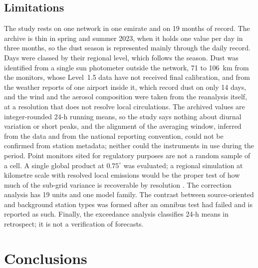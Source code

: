 \subsection{Limitations}
\label{sec:limits}

The study rests on one network in one emirate and on 19 months of record. The archive is thin in
spring and summer 2023, when it holds one value per day in three months, so the dust season is
represented mainly through the daily record. Days were classed by their regional \pmten{} level,
which follows the season. Dust was identified from a single sun photometer outside the network,
71 to 106~km from the monitors, whose Level~1.5 data have not received final calibration, and from
the weather reports of one airport inside it, which record dust on only 14 days, and the
wind and the aerosol composition were taken from the reanalysis itself, at a resolution that does
not resolve local circulations. The archived values are integer-rounded 24-h running
means, so the study says nothing about diurnal variation or short peaks, and the alignment of the
averaging window, inferred from the data and from the national reporting convention, could not be
confirmed from station metadata; neither could the instruments in use during the period. Point monitors sited for regulatory purposes are not a random
sample of a cell. A single global product at $0.75^{\circ}$ was evaluated; a regional simulation at
kilometre scale with resolved local emissions would be the proper test of how much of the
sub-grid variance is recoverable by resolution \citep{ukhov2020}. The correction analysis has 19
units and one model family. The contrast between source-oriented and background station types was
formed after an omnibus test had failed and is reported as such. Finally, the exceedance analysis
classifies 24-h means in retrospect; it is not a verification of forecasts.

\section{Conclusions}


